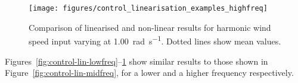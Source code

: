 \documentclass[a4paper,preprint]{elsarticle}
\begin{document}
\begin{figure}
  \centering
  \hspace*{-1cm}\texttt{[image: figures/control\_linearisation\_examples\_highfreq]}
  \caption{Comparison of linearised and non-linear results for harmonic
    wind speed input varying at \SI{1.00}{\radian\per\second}. Dotted
    lines show mean values.}
\label{fig:control-lin-highfreq}
\end{figure}

Figures~\ref{fig:control-lin-lowfreq}--\ref{fig:control-lin-highfreq} show
similar results to those shown in Figure~\ref{fig:control-lin-midfreq}, for a
lower and a higher frequency respectively.
\end{document}
